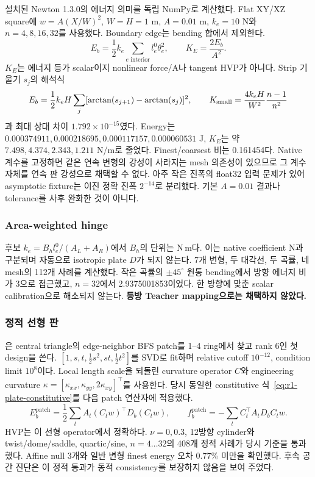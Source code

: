 \documentclass[10pt]{article}
\begin{document}
설치된 Newton 1.3.0의 에너지 의미를 독립 NumPy로 계산했다. Flat XY/XZ square에
\(w=A(X/W)^2\), \(W=H=1\) m, \(A=0.01\) m, \(k_e=10\) N와
\(n=4,8,16,32\)를 사용했다. Boundary edge는 bending 합에서 제외한다.
\[
 E_b=\frac12 k_e\sum_{e\text{ interior}}l_e^0\theta_e^2,
 \qquad K_E=\frac{2E_b}{A^2}.
\]
\(K_E\)는 에너지 등가 scalar이지 nonlinear force/A나 tangent HVP가 아니다.
Strip 기울기 \(s_j\)의 해석식
\[
 E_b=\frac12 k_eH\sum_j[\arctan(s_{j+1})-\arctan(s_j)]^2,
 \qquad K_{\rm small}=\frac{4k_eH}{W^2}\frac{n-1}{n^2}
\]
과 최대 상대 차이 \(1.792\times10^{-15}\)였다.
Energy는 \(0.000374911,0.000218695,0.000117157,0.000060531\) J,
\(K_E\)는 약 \(7.498,4.374,2.343,1.211\) N/m로 줄었다.
Finest/coarsest 비는 0.161454다. Native 계수를 고정하면 같은 연속 변형의 강성이 사라지는
mesh 의존성이 있으므로 그 계수 자체를 연속 판 강성으로 채택할 수 없다.
아주 작은 진폭의 float32 입력 문제가 있어 asymptotic fixture는 이진 정확 진폭 \(2^{-14}\)로
분리했다. 기본 \(A=0.01\) 결과나 tolerance를 사후 완화한 것이 아니다.

\subsubsection{Area-weighted hinge}

후보 \(k_e=B_hl_e^0/(A_L+A_R)\)에서 \(B_h\)의 단위는 N\,m다.
이는 native coefficient N과 구분되며 자동으로 isotropic plate \(D\)가 되지 않는다.
7개 변형, 두 대각선, 두 곡률, 네 mesh의 112개 사례를 계산했다.
작은 곡률의 \(\pm45^\circ\) 원통 bending에서 방향 에너지 비가 3으로 접근했고,
\(n=32\)에서 2.9375001853이었다. 한 방향에 맞춘 scalar calibration으로 해소되지 않는다.
\textbf{등방 Teacher mapping으로는 채택하지 않았다.}

\subsubsection{정적 선형 판}

은 central triangle의 edge-neighbor BFS patch를
1--4 ring에서 찾고 rank 6인 첫 design을 쓴다.
\([1,s,t,\tfrac12s^2,st,\tfrac12t^2]\)를 SVD로 fit하며 relative cutoff \(10^{-12}\),
condition limit \(10^8\)이다. Local length scale을 되돌린 curvature operator \(C\)와
engineering curvature \(\kappa=[\kappa_{xx},\kappa_{yy},2\kappa_{xy}]^\top\)를 사용한다.
당시 동일한 constitutive 식~\eqref{eq:r1-plate-constitutive}를 다음 patch 연산자에 적용했다.
\[
 E_b^{\mathrm{patch}}=\frac12\sum_t A_t(C_tw)^\top D_b(C_tw),\qquad
 f_b^{\mathrm{patch}}=-\sum_t C_t^\top A_tD_bC_tw.
\]
HVP는 이 선형 operator에서 정확하다. \(\nu=0,0.3\), 12방향 cylinder와 twist/dome/saddle,
quartic/sine, \(n=4\ldots32\)의 408개 정적 사례가 당시 기준을 통과했다.
Affine null 3개와 일반 변형 finest energy 오차 0.77\% 미만을 확인했다.
후속 공간 진단은 이 정적 통과가 동적 consistency를 보장하지 않음을 보여 주었다.
\end{document}
